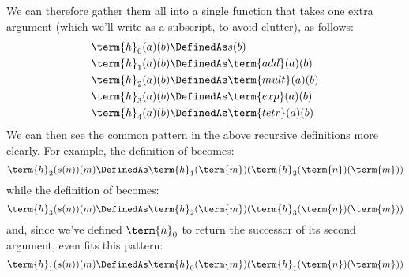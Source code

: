 We can therefore gather them all into a single function that takes one extra argument (which we'll write as a subscript, to avoid clutter), as follows:
\begin{align*}
\term{h}_{0}(a)(b) &\DefinedAs 	s(b)
\\
\term{h}_{1}(a)(b) &\DefinedAs 	\term{add}(a)(b)
\\
\term{h}_{2}(a)(b) &\DefinedAs 	\term{mult}(a)(b)
\\
\term{h}_{3}(a)(b) &\DefinedAs 	\term{exp}(a)(b)
\\
\term{h}_{4}(a)(b) &\DefinedAs 	\term{tetr}(a)(b)
\end{align*}
We can then see the common pattern in the above recursive definitions more clearly.  For example, the definition of  becomes:
\[
\term{h}_{2}(s(n))(m) \DefinedAs 	
\term{h}_{1}(\term{m})(\term{h}_{2}(\term{n})(\term{m}))
\]
while the definition of  becomes:
\[
\term{h}_{3}(s(n))(m) \DefinedAs 	
\term{h}_{2}(\term{m})(\term{h}_{3}(\term{n})(\term{m}))
\]
and, since we've defined $\term{h}_{0}$ to return the successor of its second argument, even  fits this pattern:
\[
\term{h}_{1}(s(n))(m) \DefinedAs 	
\term{h}_{0}(\term{m})(\term{h}_{1}(\term{n})(\term{m}))
\]



